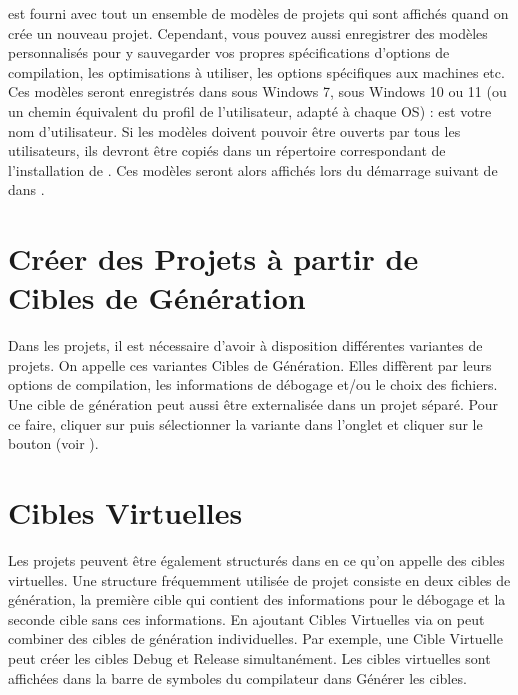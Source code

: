 \codeblocks est fourni avec tout un ensemble de modèles de projets qui sont affichés quand on crée un nouveau projet. Cependant, vous pouvez aussi enregistrer des modèles personnalisés pour y sauvegarder vos propres spécifications d'options de compilation, les optimisations à utiliser, les options spécifiques aux machines etc. Ces modèles seront enregistrés dans  sous Windows 7,  sous Windows 10 ou 11 (ou un chemin équivalent du profil de l'utilisateur, adapté à chaque OS) :  est votre nom d'utilisateur. Si les modèles doivent pouvoir être ouverts par tous les utilisateurs, ils devront être copiés dans un répertoire correspondant de l'installation de \codeblocks. Ces modèles seront alors affichés lors du démarrage suivant de \codeblocks dans .


\section{Créer des Projets à partir de Cibles de Génération}

Dans les projets, il est nécessaire d'avoir à disposition différentes variantes de projets. On appelle ces variantes Cibles de Génération. Elles diffèrent par leurs options de compilation, les informations de débogage et/ou le choix des fichiers. Une cible de génération peut aussi être externalisée dans un projet séparé. Pour ce faire, cliquer sur  puis sélectionner la variante dans l'onglet  et cliquer sur le bouton  (voir ).


\section{Cibles Virtuelles}

Les projets peuvent être également structurés dans \codeblocks en ce qu'on appelle des cibles virtuelles. Une structure fréquemment utilisée de projet consiste en deux cibles de génération, la première cible  qui contient des informations pour le débogage et la seconde cible  sans ces informations. En ajoutant Cibles Virtuelles via  on peut combiner des cibles de génération individuelles. Par exemple, une Cible Virtuelle  peut créer les cibles Debug et Release simultanément. Les cibles virtuelles sont affichées dans la barre de symboles du compilateur dans Générer les cibles.

